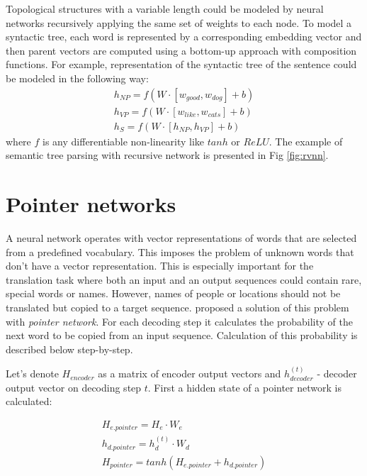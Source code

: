 Topological structures with a variable length could be modeled by neural networks recursively applying the same set of weights to each node. To model a syntactic tree, each word is represented by a corresponding embedding vector and then parent vectors are computed using a bottom-up approach with composition functions. For example, representation of the syntactic tree of the sentence  could be modeled in the following way:
\begin{equation}
\begin{split}
h_{NP} = f(W\cdot[w_{good}, w_{dog}] + b)\\
h_{VP} = f(W\cdot[w_{like}, w_{cats}] + b)\\
h_S = f(W\cdot[h_{NP}, h_{VP}] + b)
\label{rvnn:example}
\end{split}
\end{equation}
where $f$ is any differentiable non-linearity like $tanh$ or $ReLU$. The example of semantic tree parsing with recursive network is presented in Fig \ref{fig:rvnn}.

\section{Pointer networks} \label{pointer}
A neural network operates with vector representations of words that are selected from a predefined vocabulary. This imposes the problem of unknown words that don't have a vector representation. This is especially important for the translation task where both an input and an output sequences could contain rare, special words or names. However, names of people or locations should not be translated but copied to a target sequence. \cite{Vinyals2015} proposed a solution of this problem with \emph{pointer network}. For each decoding step it calculates the probability of the next word to be copied from an input sequence. Calculation of this probability is described below step-by-step.

Let's denote $H_{encoder}$ as a matrix of encoder output vectors and $h_{decoder}^{(t)}$ - decoder output vector on decoding step $t$. First a hidden state of a pointer network is calculated:

\begin{equation}
    \begin{gathered}
    
    H_{e.pointer} = H_e \cdot W_{e}\\
    
    h_{d.pointer} = h_{d}^{(t)} \cdot W_{d}\\
    
    H_{pointer} = tanh(H_{e.pointer} + h_{d.pointer})\\
    
    \end{gathered}
    \label{eq:pointer}
\end{equation}


